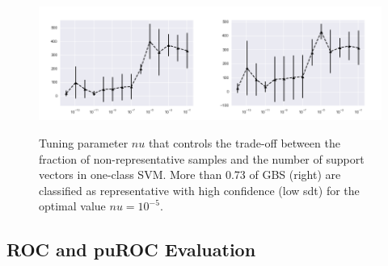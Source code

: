 \begin{figure}[ht]
	\begin{center}
		\includegraphics[scale=0.55,angle=0]{fig/occfigure}
		\label{occ}
		\vspace*{-1.0cm}
		\caption{Tuning parameter \(nu\) that controls the trade-off between the fraction of non-representative samples and the number of support vectors in one-class SVM. More than 0.73 of GBS (right) are classified as representative with high confidence (low sdt) for the optimal value \(nu = 10^{-5}\).}
	\end{center}
\end{figure}

\subsection{ROC and puROC Evaluation}

